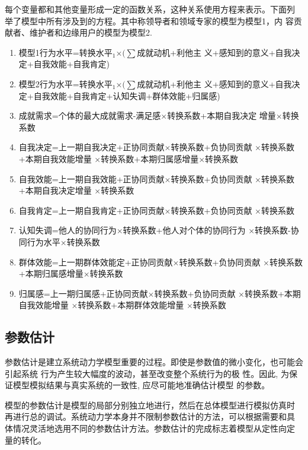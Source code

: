 每个变量都和其他变量形成一定的函数关系，这种关系使用方程来表示。下面列
举了模型中所有涉及到的方程。其中称领导者和领域专家的模型为模型1，内
容贡献者、维护者和边缘用户的模型为模型2.
\begin{enumerate}
\item 模型1行为水平=转换水平$_1$$\times (\sum$成就动机+利他主
  义+感知到的意义+自我决定+自我效能+自我肯定)
\item 模型2行为水平=转换水平$_1$$\times (\sum$成就动机+利他主
  义+感知到的意义+自我决定+自我效能+自我肯定+认知失调+群体效能+归属感)
  
\item 成就需求=个体的最大成就需求-满足感$\times$转换系数+本期自我决定
  增量$\times$转换系数
\item 自我决定=上一期自我决定+正协同贡献$\times$转换系数+负协同贡献
  $\times$转换系数+本期自我效能增量 $\times$转换系数+本期归属感增量$\times$转换系数
\item  自我效能=上一期自我效能+正协同贡献$\times$转换系数+负协同贡献
  $\times$转换系数+本期自我决定增量 $\times$转换系数
\item 自我肯定=上一期自我肯定+正协同贡献$\times$转换系数+负协同贡献
  $\times$转换系数
\item 认知失调=他人的协同行为$\times$转换系数+他人对个体的协同行为
  $\times$转换系数-协同行为水平$\times$转换系数
\item 群体效能=上一期群体效能定+正协同贡献$\times$转换系数+负协同贡献
  $\times$转换系数+本期归属感增量$\times$转换系数
\item 归属感=上一期归属感+正协同贡献$\times$转换系数+负协同贡献
  $\times$转换系数+本期自我效能增量 $\times$转换系数+本期群体效能增量 $\times$转换系数



\end{enumerate}

\subsection{参数估计}
参数估计是建立系统动力学模型重要的过程。即使是参数值的微小变化，也可能会引起系统
行为产生较大幅度的波动，甚至改变整个系统行为的极
性。因此, 为保证模型模拟结果与真实系统的一致性, 应尽可能地准确估计模型
的参数。

模型的参数估计是模型的局部分别独立地进行，然后在总体模型进行模拟仿真时
再进行总的调试。系统动力学本身并不限制参数估计的方法，可以根据需要和具
体情况灵活地选用不同的参数估计方法。参数估计的完成标志着模型从定性向定
量的转化。

